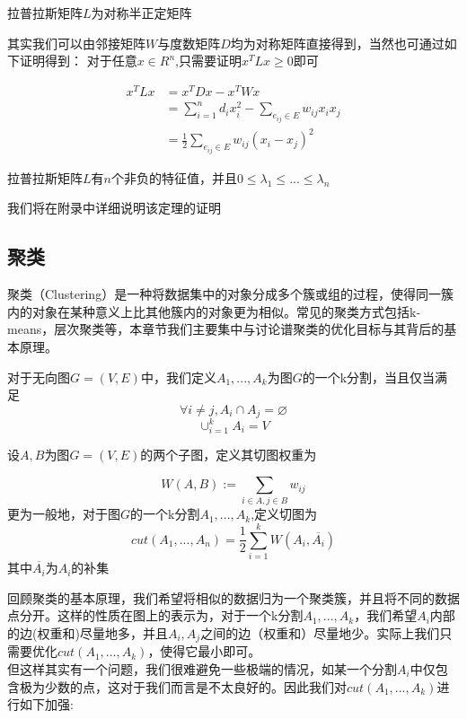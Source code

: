 \documentclass[11pt]{scrartcl}
\begin{document}
\begin{theorem}
拉普拉斯矩阵$L$为对称半正定矩阵
\end{theorem}
其实我们可以由邻接矩阵$W$与度数矩阵$D$均为对称矩阵直接得到，当然也可通过如下证明得到：
对于任意$x\in R^n$,只需要证明$x^T L x\ge 0$即可


\begin{equation}
\begin{aligned}
x^T L x &= x^T D x-x^T W x\\
&=\sum_{i=1}^n d_i x_i^2-\sum_{e_{ij}\in E}w_{ij}x_ix_j\\
&=\frac{1}{2}\sum_{e_{ij}\in E}w_{ij}(x_i-x_j)^2
\end{aligned}
\end{equation}

\begin{theorem}
拉普拉斯矩阵$L$有$n$个非负的特征值，并且$0\le \lambda_1\le...\le\lambda_n$
\end{theorem}
我们将在附录中详细说明该定理的证明



\subsection{聚类}
聚类（Clustering）是一种将数据集中的对象分成多个簇或组的过程，使得同一簇内的对象在某种意义上比其他簇内的对象更为相似。常见的聚类方式包括k-means，层次聚类等，本章节我们主要集中与讨论谱聚类的优化目标与其背后的基本原理。
\begin{definition}[图的分割]
对于无向图$G=(V,E)$中，我们定义$A_1,...,A_k$为图$G$的一个k分割，当且仅当满足
$$
\forall i\not =j,A_i\cap A_j=\varnothing 
$$
$$
\cup_{i=1}^k A_i=V
$$
\end{definition}

\begin{definition}[切图权重]
设$A,B$为图$G=(V,E)$的两个子图，定义其切图权重为

$$
W(A,B):=\sum_{i \in A,j \in B} w_{ij}
$$
更为一般地，对于图$G$的一个k分割$A_1,...,A_k$,定义切图为
$$
cut(A_1,...,A_n)=\frac{1}{2}\sum_{i=1}^k W(A_i,\overline{A_i})
$$
其中$\overline{A_i}$为$A_i$的补集
\end{definition}
回顾聚类的基本原理，我们希望将相似的数据归为一个聚类簇，并且将不同的数据点分开。这样的性质在图上的表示为，对于一个k分割$A_1,...,A_k$，我们希望$A_i$内部的边(权重和)尽量地多，并且$A_i,A_j$之间的边（权重和）尽量地少。实际上我们只需要优化$cut(A_1,...,A_k)$，使得它最小即可。\\
但这样其实有一个问题，我们很难避免一些极端的情况，如某一个分割$A_i$中仅包含极为少数的点，这对于我们而言是不太良好的。因此我们对$cut(A_1,...,A_k)$进行如下加强:
\end{document}
